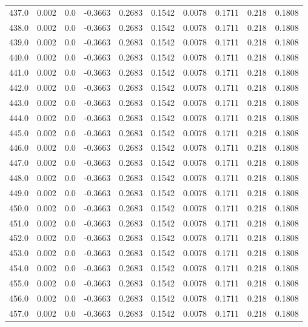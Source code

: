 \begin{longtable}{lrrrrrrrrr}
437.0 & 0.002 & 0.0 & -0.3663 & 0.2683 & 0.1542 & 0.0078 & 0.1711 & 0.218 & 0.1808 \\
438.0 & 0.002 & 0.0 & -0.3663 & 0.2683 & 0.1542 & 0.0078 & 0.1711 & 0.218 & 0.1808 \\
439.0 & 0.002 & 0.0 & -0.3663 & 0.2683 & 0.1542 & 0.0078 & 0.1711 & 0.218 & 0.1808 \\
440.0 & 0.002 & 0.0 & -0.3663 & 0.2683 & 0.1542 & 0.0078 & 0.1711 & 0.218 & 0.1808 \\
441.0 & 0.002 & 0.0 & -0.3663 & 0.2683 & 0.1542 & 0.0078 & 0.1711 & 0.218 & 0.1808 \\
442.0 & 0.002 & 0.0 & -0.3663 & 0.2683 & 0.1542 & 0.0078 & 0.1711 & 0.218 & 0.1808 \\
443.0 & 0.002 & 0.0 & -0.3663 & 0.2683 & 0.1542 & 0.0078 & 0.1711 & 0.218 & 0.1808 \\
444.0 & 0.002 & 0.0 & -0.3663 & 0.2683 & 0.1542 & 0.0078 & 0.1711 & 0.218 & 0.1808 \\
445.0 & 0.002 & 0.0 & -0.3663 & 0.2683 & 0.1542 & 0.0078 & 0.1711 & 0.218 & 0.1808 \\
446.0 & 0.002 & 0.0 & -0.3663 & 0.2683 & 0.1542 & 0.0078 & 0.1711 & 0.218 & 0.1808 \\
447.0 & 0.002 & 0.0 & -0.3663 & 0.2683 & 0.1542 & 0.0078 & 0.1711 & 0.218 & 0.1808 \\
448.0 & 0.002 & 0.0 & -0.3663 & 0.2683 & 0.1542 & 0.0078 & 0.1711 & 0.218 & 0.1808 \\
449.0 & 0.002 & 0.0 & -0.3663 & 0.2683 & 0.1542 & 0.0078 & 0.1711 & 0.218 & 0.1808 \\
450.0 & 0.002 & 0.0 & -0.3663 & 0.2683 & 0.1542 & 0.0078 & 0.1711 & 0.218 & 0.1808 \\
451.0 & 0.002 & 0.0 & -0.3663 & 0.2683 & 0.1542 & 0.0078 & 0.1711 & 0.218 & 0.1808 \\
452.0 & 0.002 & 0.0 & -0.3663 & 0.2683 & 0.1542 & 0.0078 & 0.1711 & 0.218 & 0.1808 \\
453.0 & 0.002 & 0.0 & -0.3663 & 0.2683 & 0.1542 & 0.0078 & 0.1711 & 0.218 & 0.1808 \\
454.0 & 0.002 & 0.0 & -0.3663 & 0.2683 & 0.1542 & 0.0078 & 0.1711 & 0.218 & 0.1808 \\
455.0 & 0.002 & 0.0 & -0.3663 & 0.2683 & 0.1542 & 0.0078 & 0.1711 & 0.218 & 0.1808 \\
456.0 & 0.002 & 0.0 & -0.3663 & 0.2683 & 0.1542 & 0.0078 & 0.1711 & 0.218 & 0.1808 \\
457.0 & 0.002 & 0.0 & -0.3663 & 0.2683 & 0.1542 & 0.0078 & 0.1711 & 0.218 & 0.1808 \\

\end{longtable}
